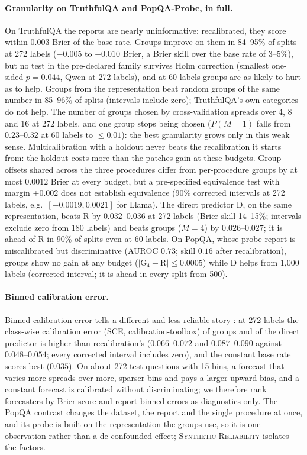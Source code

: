 \documentclass[11pt]{article}
\theoremstyle{definition}
\theoremstyle{remark}
\newcommand{\1}{\mathbf{1}}
\newcommand{\expname}[1]{\textsc{#1}}
\begin{document}
\paragraph{Granularity on TruthfulQA and PopQA-Probe, in full.}
On TruthfulQA the reports are nearly uninformative: recalibrated, they score within $0.003$ Brier of
the base rate. Groups improve on them in 84--95\% of splits at 272 labels ($-0.005$ to $-0.010$ Brier,
a Brier skill over the base rate of 3--5\%), but no test in the pre-declared family survives Holm
correction (smallest one-sided $p=0.044$, Qwen at 272 labels), and at 60 labels groups are as likely to
hurt as to help. Groups from the representation beat random groups of the same number in 85--96\% of
splits (intervals include zero); TruthfulQA's own categories do not help. The number of groups chosen by
cross-validation spreads over 4, 8 and 16 at 272 labels, and one group stops being chosen
($P(M=1)$ falls from $0.23$--$0.32$ at 60 labels to $\le0.01$): the best granularity grows only in this
weak sense. Multicalibration with a holdout never beats the recalibration it starts from: the holdout
costs more than the patches gain at these budgets. Group offsets shared across the three procedures
differ from per-procedure groups by at most $0.0012$ Brier at every budget, but a pre-specified
equivalence test with margin $\pm0.002$ does not establish equivalence (90\% corrected intervals at 272
labels, e.g.\ $[-0.0019,0.0021]$ for Llama). The direct predictor D, on the same representation,
beats R by $0.032$--$0.036$ at 272 labels (Brier skill 14--15\%; intervals exclude zero from 180 labels)
and beats groups ($M=4$) by $0.026$--$0.027$; it is ahead of R in 90\% of splits even at 60 labels. On PopQA,
whose probe report is miscalibrated but discriminative (AUROC $0.73$; skill $0.16$ after
recalibration), groups show no gain at any budget ($|$G$_4-$R$|\le0.0005$) while D helps from 1{,}000 labels (corrected
interval; it is ahead in every split from 500).

\paragraph{Binned calibration error.}
Binned calibration error tells a different and less reliable story :
at 272 labels the class-wise calibration error (SCE, calibration-toolbox) of groups and of the direct
predictor is higher than recalibration's ($0.066$--$0.072$ and $0.087$--$0.090$ against $0.048$--$0.054$;
every corrected interval includes zero), and the constant base rate scores best ($0.035$). On about 272
test questions with 15 bins, a forecast that varies more spreads over more, sparser bins and pays a
larger upward bias, and a constant forecast is calibrated without discriminating; we therefore rank
forecasters by Brier score and report binned errors as diagnostics only.
The PopQA contrast changes the dataset, the report and the single procedure at once, and its probe is
built on the representation the groups use, so it is one observation rather than a de-confounded
effect; \expname{Synthetic-Reliability} isolates the factors.
\end{document}

